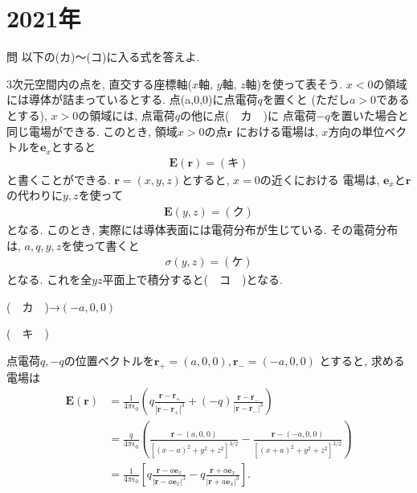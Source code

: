\documentclass[a4paper,12pt]{jlreq}
\begin{document}
\vspace{50mm}

\section*{2021年}


\begin{itembox}[l]{問}
  以下の(カ)〜(コ)に入る式を答えよ.\par
  3次元空間内の点を, 直交する座標軸($x$軸, $y$軸, $z$軸)を使って表そう.
  $x<0$の領域には導体が詰まっているとする. 点(a,0,0)に点電荷$q$を置くと
  (ただし$a>0$であるとする), $x>0$の領域には, 点電荷$q$の他に点(　カ　)に
  点電荷$-q$を置いた場合と同じ電場ができる. このとき, 領域$x>0$の点$\bm{r}$
  における電場は, $x$方向の単位ベクトルを$\bm{e}_x$とすると
  \begin{align}
    \bm{E}(\bm{r}) = (　キ　)
  \end{align}
と書くことができる. $\bm{r} = (x,y,z)$とすると, $x = 0$の近くにおける
電場は, $\bm{e}_x$と$\bm{r}$の代わりに$y,z$を使って
\begin{align}
  \bm{E}(y,z) = (　ク　)
\end{align}
となる. このとき, 実際には導体表面には電荷分布が生じている. 
その電荷分布は, $a,q,y,z$を使って書くと
\begin{align}
  \sigma(y,z) = (　ケ　)
\end{align}
となる. これを全$yz$平面上で積分すると(　コ　)となる. 

\end{itembox}
\par

(　カ　)→$(-a,0,0)$\par

(　キ　)\par
点電荷$q,-q$の位置ベクトルを$\bm{r}_+ = (a,0,0), \bm{r}_- = (-a,0,0)$
とすると, 求める電場は
\begin{align}
  \bm{E}(\bm{r}) &= \frac{1}{4\pi \epsilon_0} \left(q\frac{\bm{r}-\bm{r}_+}{|\bm{r}-\bm{r}_+|^3} + (-q)\frac{\bm{r}-\bm{r}_-}{|\bm{r}-\bm{r}_-|^3}\right)\\
&= \frac{q}{4\pi \epsilon_0}\left(\frac{\bm{r}-(a,0,0)}{[(x-a)^2 + y^2 + z^2]^{3/2}} - \frac{\bm{r}-(-a,0,0)}{[(x+a)^2 + y^2 + z^2]^{3/2}}\right)\\
&= \frac{1}{4\pi \epsilon_0} \left[q\frac{\bm{r}-a\bm{e}_x}{|\bm{r}-a\bm{e}_x|^3} -q\frac{\bm{r}+a\bm{e}_x}{|\bm{r}+a\bm{e}_x|^3}\right].
\end{align}
\end{document}
